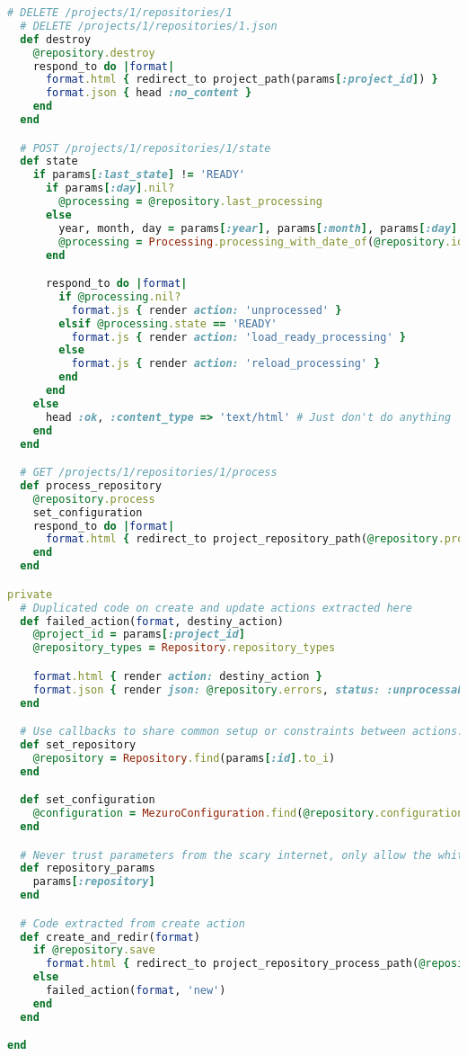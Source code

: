 \begin{lstlisting}[language=Ruby]
  # DELETE /projects/1/repositories/1
  # DELETE /projects/1/repositories/1.json
  def destroy
    @repository.destroy
    respond_to do |format|
      format.html { redirect_to project_path(params[:project_id]) }
      format.json { head :no_content }
    end
  end

  # POST /projects/1/repositories/1/state
  def state
    if params[:last_state] != 'READY'
      if params[:day].nil?
        @processing = @repository.last_processing
      else
        year, month, day = params[:year], params[:month], params[:day]
        @processing = Processing.processing_with_date_of(@repository.id, "#{year}-#{month}-#{day}")
      end

      respond_to do |format|
        if @processing.nil?
          format.js { render action: 'unprocessed' }
        elsif @processing.state == 'READY'
          format.js { render action: 'load_ready_processing' }
        else
          format.js { render action: 'reload_processing' }
        end
      end
    else
      head :ok, :content_type => 'text/html' # Just don't do anything
    end
  end

  # GET /projects/1/repositories/1/process
  def process_repository
    @repository.process
    set_configuration
    respond_to do |format|
      format.html { redirect_to project_repository_path(@repository.project_id, @repository.id) }
    end
  end

private
  # Duplicated code on create and update actions extracted here
  def failed_action(format, destiny_action)
    @project_id = params[:project_id]
    @repository_types = Repository.repository_types

    format.html { render action: destiny_action }
    format.json { render json: @repository.errors, status: :unprocessable_entity }
  end

  # Use callbacks to share common setup or constraints between actions.
  def set_repository
    @repository = Repository.find(params[:id].to_i)
  end

  def set_configuration
    @configuration = MezuroConfiguration.find(@repository.configuration_id)
  end

  # Never trust parameters from the scary internet, only allow the white list through.
  def repository_params
    params[:repository]
  end

  # Code extracted from create action
  def create_and_redir(format)
    if @repository.save
      format.html { redirect_to project_repository_process_path(@repository.project_id, @repository.id), notice: 'Repository was successfully created.' }
    else
      failed_action(format, 'new')
    end
  end

end
\end{lstlisting}


